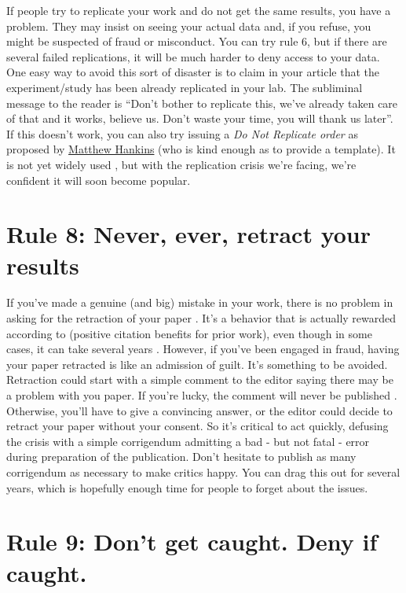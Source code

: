 \documentclass[11pt,letter]{article}
\providecommand\citep{\cite}
\begin{document}
If people try to replicate your work
and do not get the same results, you have a problem. They may insist on seeing your actual
data and, if you refuse, you might be suspected of
fraud or misconduct. You can try rule 6, but if there are several failed replications, it will be much
harder to deny access to your data. One easy way to avoid this sort of disaster is
to claim in your article that the experiment/study has been already
replicated in your lab. The subliminal message to the reader is ``Don't bother
to replicate this, we've already taken care of that and it works, believe us. Don't
waste your time, you will thank us later''. If this doesn't work, you can also
try issuing a {\em Do Not Replicate order} as proposed by
\href{https://mchankins.wordpress.com/2014/07/12/do-not-replicate/}{Matthew
  Hankins} (who is kind enough as to provide a template). It is not yet widely
used , but with the replication crisis we're facing, we're confident it will soon become popular.

\section*{Rule 8: Never, ever, retract your results}

If you've made a genuine (and big) mistake in your work, there is no problem in
asking for the retraction of your paper  \citep{miller:2006}. It's a
behavior that is actually rewarded according to \citep{lu:2013} (positive citation benefits for prior work), even though in some cases, it can take several years \citep{trivers:2009}. However, if you've been
engaged in fraud, having your paper retracted is like an admission of guilt. It's something to be avoided. Retraction could start with a simple comment to the
editor saying there may be a problem with you paper. If you're lucky, the comment will never be published
\citep{trebino:2009}. Otherwise, you'll have to give a convincing answer, or the editor could decide to retract your paper
without your consent. So it's critical to act quickly, defusing the crisis with a simple corrigendum admitting a bad - but not fatal - error during preparation of the publication.  Don't hesitate to publish as many corrigendum as
necessary to make critics happy. You can drag this out for several years, which is hopefully enough time for people to forget about the issues.

\section*{Rule 9: Don't get caught. Deny if caught.}
\end{document}
